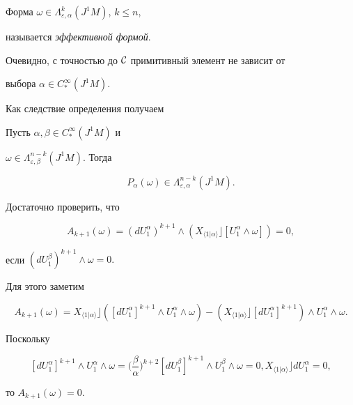 Форма $\omega \in \Lambda_{\varepsilon ,\alpha }^k(J^1M)$, $k\leq n$,


называется {\em эффективной формой}.





Очевидно, с точностью до ${\cal C}$ примитивный элемент не зависит от


выбора $\alpha \in C_{*}^\infty (J^1M)$.


Как следствие определения получаем 





\begin{lem}


Пусть $\alpha ,\beta \in


C_{*}^\infty (J^1M)$ и


$\omega \in \Lambda_{\varepsilon ,\beta}^{n-k}(J^1M)$. Тогда 


\begin{equation}


P_\alpha (\omega )\in \Lambda_{\varepsilon ,\alpha }^{n-k}(J^1M).


\label{invprim}


\end{equation}


\end{lem}





\begin{pf}


Достаточно проверить, что


$$


A_{k+1}(\omega )=(dU_1^\alpha )^{k+1}\wedge ( X_{\langle 1|\alpha


\rangle }\rfloor [U_1^\alpha \wedge \omega ]) =0,


$$


если $(dU_1^\beta )^{k+1}\wedge \omega =0.$


Для этого заметим


$$


A_{k+1}(\omega )=X_{\langle 1|\alpha \rangle }\rfloor ([dU_1^\alpha


]^{k+1}\wedge U_1^\alpha \wedge \omega) -( X_{\langle 1|\alpha


\rangle }\rfloor [dU_1^\alpha ]^{k+1}) \wedge U_1^\alpha \wedge \omega.


$$


Поскольку


$$


[dU_1^\alpha ]^{k+1}\wedge U_1^\alpha \wedge \omega =\bigg( \frac


\beta \alpha \bigg)^{k+2}[dU_1^\beta ]^{k+1}\wedge U_1^\beta \wedge \omega


=0,X_{\langle 1|\alpha \rangle }\rfloor dU_1^\alpha =0,


$$


то $A_{k+1}(\omega )=0$.


\end{pf}





